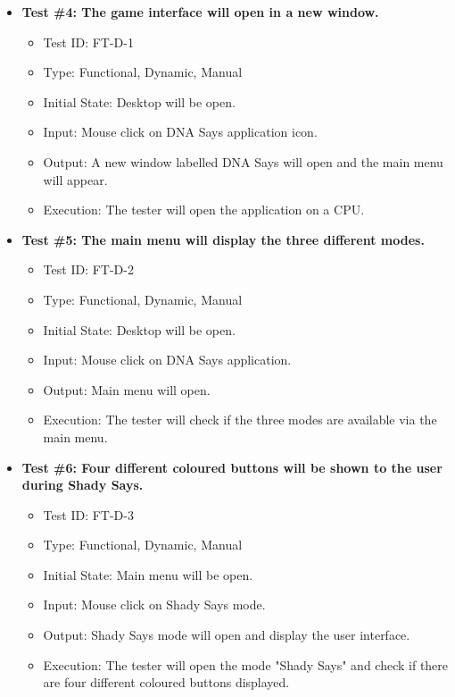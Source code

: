 \documentclass[12pt, titlepage]{article}
\begin{document}
\begin{itemize}

\item \textbf{Test \#4: The game interface will open in a new window.}
\begin{itemize}
\item Test ID: FT-D-1
\item Type: Functional, Dynamic, Manual 		
\item Initial State: Desktop will be open. 				
\item Input: Mouse click on DNA Says application icon. 					
\item Output: A new window labelled DNA Says will open and the main menu will appear.  					
\item Execution: The tester will open the application on a CPU.
\end{itemize}

\item \textbf{Test \#5: The main menu will display the three different modes.}
\begin{itemize}
\item Test ID: FT-D-2
\item Type: Functional, Dynamic, Manual	
\item Initial State: Desktop will be open.					
\item Input: Mouse click on DNA Says application.					
\item Output: Main menu will open. 					
\item Execution: The tester will check if the three modes are available via the main menu.
\end{itemize}

\item \textbf{Test \#6: Four different coloured buttons will be shown to the user during Shady Says.}
\begin{itemize}
\item Test ID: FT-D-3
\item Type: Functional, Dynamic, Manual		
\item Initial State: Main menu will be open.					
\item Input: Mouse click on Shady Says mode.					
\item Output: Shady Says mode will open and display the user interface.					
\item Execution: The tester will open the mode "Shady Says" and check if there are four different coloured buttons displayed.
\end{itemize}


\end{itemize}
\end{document}
